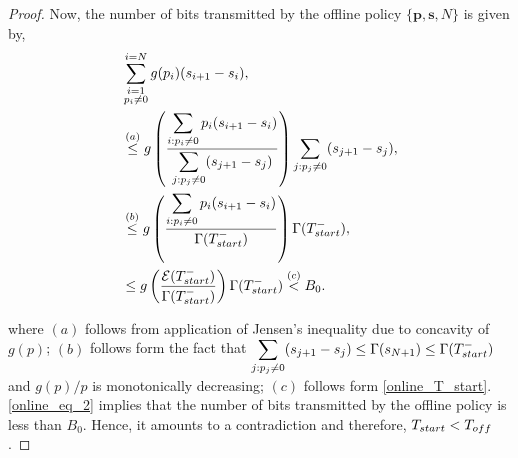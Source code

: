 \begin{proof}
Now, the number of bits transmitted by the offline policy $\{\bm{p},\bm{s},N\}$ is given by,
\begin{align}
&\sum_{{\substack{i=1\\p_i\neq 0}}}^{i=N} g(p_i)(s_{i+1}-s_{i}),
\\
&\nonumber \stackrel{(a)}{\le}g\left(\frac{\displaystyle\sum_{i:p_i\neq 0}p_i(s_{i+1}-s_{i})}{\displaystyle\sum_{j:p_j\neq 0}(s_{j+1}-s_{j})}\right)\sum_{j:p_j\neq 0} (s_{j+1}-s_{j}),
\\
&\nonumber\stackrel{(b)}{\le} g\left( \frac{\displaystyle\sum_{i:p_i\neq 0} p_i(s_{i+1}-s_{i})}{\TRx(T_{\mbox{\scriptsize{start}}}^-)} \right)\TRx(T_{\mbox{\scriptsize{start}}}^-), 
\\
&\le g\left(\frac{\ETx(T_{\mbox{\scriptsize{start}}}^-)}{\TRx(T_{\mbox{\scriptsize{start}}}^-)}\right)\TRx(T_{\mbox{\scriptsize{start}}}^-)\stackrel{(c)}{<}B_0.\label{online_eq_2}
\end{align}

where $(a)$ follows from application of Jensen's inequality due to concavity of $g(p)$; $(b)$ follows form the fact that $\displaystyle\sum_{j:p_j\neq 0}(s_{j+1}-s_{j})\le\TRx(s_{N+1})\le \TRx(T_{\mbox{\scriptsize{start}}}^-)$ and $g(p)/p$ is monotonically decreasing; $(c)$ follows form \eqref{online_T_start}. \eqref{online_eq_2} implies that the number of bits transmitted by the offline policy is less than $B_0$. Hence, it amounts to a contradiction and therefore, $T_{\mbox{\scriptsize{start}}}<T_{\mbox{\scriptsize{off}}}$.

%


\end{proof}
